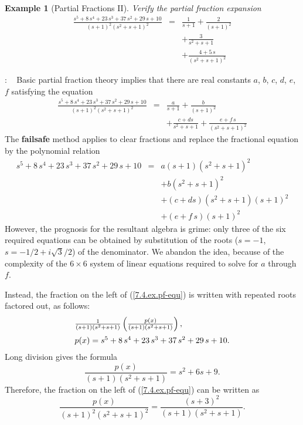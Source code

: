 \documentclass{article}
\def\df{\bfseries}
\def\dd{\displaystyle}
\def\BF#1{{\df #1}}
\def\rf#1{(\ref{#1})}
\newtheorem{Example}{Example}[section]
\newenvironment{Solution}{\par\noindent{\sffamily\bfseries\upshape Solution}:\small\rm}{\par\medskip}
\begin{document}
\begin{Example}[Partial Fractions II]\label{7-4.ex.partial-fractions-II}
Verify the partial fraction expansion
$$
 \begin{array}{lcl}
 \dd {\frac {{s}^{5}+8\,{s}^{4}+23\,{s}^{3}+37\,{s}^{2}+29\,s+10}{\left (s+
 1\right )^{2}\left ({s}^{2}+s+1\right )^{2}}} &=&
 \dd\frac{1}{s+1} +\frac{2}{(s+1)^{2}} \\[2ex]
 & & \dd +\frac{3}{{s}^{2}+s +1} \\[2ex] & & \dd +{\frac {4+5\,s}{({s}^{2}+s+1)^{2}}}
 \end{array}
$$
\end{Example}
\begin{Solution} ~\newline
Basic partial fraction theory implies that there are real
constants $a$, $b$, $c$, $d$, $e$, $f$ satisfying the equation
\begin{equation}\label{7.4.ex.pf-equ}
 \begin{array}{lcl}
 \dd {\frac {{s}^{5}+8\,{s}^{4}+23\,{s}^{3}+37\,{s}^{2}+29\,s+10}{\left (s+
 1\right )^{2}\left ({s}^{2}+s+1\right )^{2}}} &=&
 \dd\frac{a}{s+1}
 +\frac{b}{(s+1)^{2}}\\ [2ex]
 && \dd +\frac{c+ds}{{s}^{2}+s +1}+{\frac {e+f\,s}{({s}^{2}+s+1)^{2}}}
 \end{array}
\end{equation}
The \BF{failsafe} method applies to clear fractions and replace
the fractional equation by the polynomial relation
$$
 \begin{array}{lcl}
 \dd {s}^{5}+8\,{s}^{4}+23\,{s}^{3}+37\,{s}^{2}+29\,s+10 &=&
 \dd a(s+1)({s}^{2}+s+1)^{2} \\
 & & +b({s}^{2}+s+1)^{2}\\
 && \dd +(c+ds)({s}^{2}+s +1)(s+1)^2 \\
 &&+ (e+f\,s)(s+1)^2
 \end{array}
$$
However, the prognosis for the resultant algebra is grime: only
three of the six required equations can be obtained by
substitution of the roots ($s=-1$, $s=-1/2+i\sqrt3/2$) of the
denominator. We abandon the idea, because of the complexity of the
$6\times 6$ system of linear equations required to solve for $a$
through $f$.

Instead, the fraction on the left of \rf{7.4.ex.pf-equ} is written
with repeated roots factored out, as follows:
$$
  \begin{array}{l}
  \frac{1}{(s+1)(s^2+s+1)}\left(\frac{p(x)}{(s+1)(s^2+s+1)}\right),\\
  [2ex]
  p(x)={s}^{5}+8\,{s}^{4}+23\,{s}^{3}+37\,{s}^{2}+29\,s+10.
  \end{array}\dd
$$
Long division gives the formula
$$
 \frac{p(x)}{(s+1)(s^2+s+1)} = s^2+6s+9.
$$
Therefore, the fraction on the left of \rf{7.4.ex.pf-equ} can be
written as $$
 \frac{p(x)}{(s+1)^2(s^2+s+1)^2} = \frac{(s+3)^2}{(s+1)(s^2+s+1)}.
$$

\end{Solution}
\end{document}
